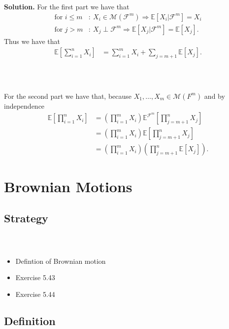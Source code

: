 \documentclass{beamer}
\numberwithin{equation}{section}
\newenvironment{frame2}{\begin{frame}\frametitle{{\normalsize \secname} \\ {\large \subsecname}}}{\end{frame}}
\begin{document}
\begin{frame2}
    \textbf{Solution.}
    For the first part we have that
    \begin{align}
        \text{for } i \leq m&: \ X_i \in \mathcal{M}(\mathcal{F}^m) \Rightarrow \mathbb{E}\left[X_i|\mathcal{F}^m\right] = X_i \\
        \text{for } j > m&: \ X_j \perp \mathcal{F}^m \Rightarrow \mathbb{E}\left[X_j|\mathcal{F}^m\right] = \mathbb{E}[X_j].
    \end{align}
    Thus we have that
    \begin{align}
        \mathbb{E}\left[ \sum_{i = 1}^n X_i \right] &= \sum_{i=1}^m X_i + \sum_{j = m+1}\mathbb{E}\left[X_j\right].
    \end{align}
\end{frame2}

\begin{frame2}
    For the second part we have that, because $X_1,\ldots,X_m \in \mathcal{M}(F^m)$ and by independence
    \begin{align}
        \mathbb{E}\left[ \prod_{i = 1}^n X_i \right] &= \left(\prod_{i=1}^m X_i\right) \mathbb{E}^{\mathcal{F}^m}\left[\prod_{j=m+1}^n X_j\right] \\
        &= \left(\prod_{i=1}^m X_i\right) \mathbb{E}\left[\prod_{j=m+1}^n X_j\right] \\
        &= \left(\prod_{i=1}^m X_i\right)\left(\prod_{j=m+1}^n \mathbb{E}[X_j]\right).
    \end{align}
\end{frame2}

\section{Brownian Motions}

\subsection{Strategy}
\begin{frame2}
    \begin{itemize}
        \item Defintion of Brownian motion
        \item Exercise 5.43
        \item Exercise 5.44
    \end{itemize}
\end{frame2}

\subsection{Definition}
\end{document}
